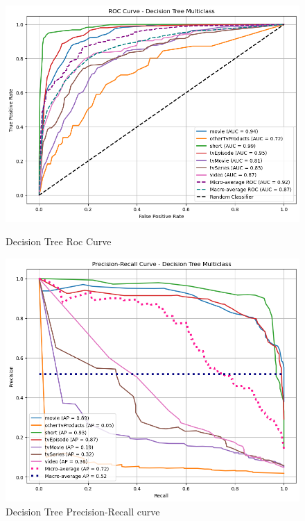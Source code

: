 \documentclass[10pt]{article}
\begin{document}
\begin{figure}[ht]
    \centering
    \begin{minipage}{0.48\textwidth}
        \centering
        \includegraphics[width=\linewidth]{RocDT.png}
        \caption{Decision Tree Roc Curve}
        \label{fig:dt_roc}
    \end{minipage}
    \hfill
    \begin{minipage}{0.48\textwidth}
        \centering
        \includegraphics[width=\linewidth]{RecallDT.png}
        \caption{Decision Tree Precision-Recall curve}
        \label{fig:dt_pr}
    \end{minipage}
\end{figure}
\end{document}
